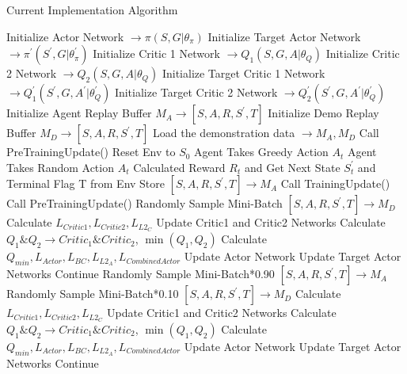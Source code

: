 \begin{algorithm}[h!]\footnotesize
  \caption{Current Implementation Algorithm}\label{CIA}
  \begin{algorithmic}[1]
    \State Initialize Actor Network $\longrightarrow \pi(S,G | \theta_\pi )$
    \State Initialize Target Actor Network $\longrightarrow \pi^{'} (S^{'}, G | \theta_\pi^{'})$
    \State Initialize Critic 1 Network $\longrightarrow Q_{1} (S, G, A | \theta_Q )$
    \State Initialize Critic 2 Network $\longrightarrow Q_{2} (S, G, A | \theta_Q )$
    \State Initialize Target Critic 1 Network $\longrightarrow Q^{'}_{1} (S^{'}, G, A^{'} | \theta_Q^{'} )$
    \State Initialize Target Critic 2 Network $\longrightarrow Q^{'}_{2} (S^{'}, G, A^{'} | \theta_Q^{'} )$
    \State Initialize Agent Replay Buffer $M_A \longrightarrow [S, A, R, S^{'}, T] $
    \State Initialize Demo Replay Buffer $M_D \longrightarrow [S, A, R, S^{'}, T] $
    \State Load the demonstration data $\longrightarrow M_A, M_D$
        \State Call PreTrainingUpdate()
    \EndFor
        \State Reset Env to $S_0$
                \State Agent Takes Greedy Action $A_{t}$
                \State Agent Takes Random Action $A_{t}$
            \EndIf
            \State Calculated Reward $R_{t}$ and Get Next State $S^{'}_{t}$ and Terminal Flag T from Env
            \State Store $[S, A, R, S^{'}, T]  \longrightarrow M_A$
                \State Call TrainingUpdate()
                \State Call PreTrainingUpdate()
            \EndIf
        \EndFor
    \EndFor
        \State Randomly Sample Mini-Batch $[S, A, R, S^{'}, T]  \longrightarrow M_D$
        \State Calculate $L_{Critic1}, L_{Critic2}, L_{L2_{C}}$
        \State Update Critic1 and Critic2 Networks
        \State Calculate $Q_1 \& Q_2 \longrightarrow Critic_1 \& Critic_2$, $\min(Q_1, Q_2)$
        \State Calculate $Q_{min}, L_{Actor}, L_{BC}, L_{L2_{A}}, L_{CombinedActor}$
        \State Update Actor Network
        \State Update Target Actor Networks
        \Else{}
            \State Continue
        \EndIf
    \EndProcedure
        \State Randomly Sample Mini-Batch*0.90 $[S, A, R, S^{'}, T]  \longrightarrow M_A$
        \State Randomly Sample Mini-Batch*0.10 $[S, A, R, S^{'}, T]  \longrightarrow M_D$
        \State Calculate $L_{Critic1}, L_{Critic2}, L_{L2_{C}}$
        \State Update Critic1 and Critic2 Networks
        \State Calculate $Q_1 \& Q_2 \longrightarrow Critic_1 \& Critic_2$, $\min(Q_1, Q_2)$
        \State Calculate $Q_{min}, L_{Actor}, L_{BC}, L_{L2_{A}},  L_{CombinedActor}$
        \State Update Actor Network
        \State Update Target Actor Networks
        \Else{}
            \State Continue
        \EndIf
    \EndProcedure
  \end{algorithmic}
\end{algorithm}

